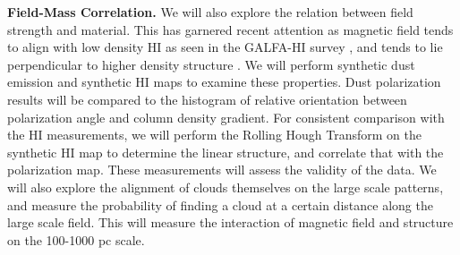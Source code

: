 \noindent
{\bf Field-Mass Correlation.}
We will also explore the relation between field strength and material.  This has
garnered recent attention as magnetic field tends to align with low density HI
as seen in the GALFA-HI survey  \citep{Clark14}, and tends to lie perpendicular
to higher density structure \citep{PlanckXXXII14}.  We will perform synthetic dust
emission and synthetic HI maps to examine these properties.  Dust polarization
results will be compared to the histogram of relative orientation between
polarization angle and column density gradient. For consistent comparison with
the HI measurements, we will perform the Rolling Hough Transform \citep{Clark14} on the
synthetic HI map to determine the linear structure, and correlate that with the
polarization map.  These measurements will assess the validity of the data.  We
will also explore the alignment of clouds themselves on the large scale
patterns, and measure the probability of finding a cloud at a certain distance
along the large scale field.  This will measure the interaction of magnetic
field and structure on the 100-1000 pc scale.




